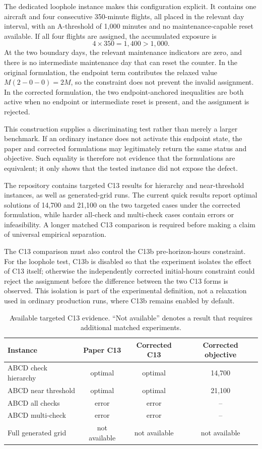 The dedicated loophole instance makes this configuration explicit. It contains
one aircraft and four consecutive 350-minute flights, all placed in the
relevant day interval, with an A-threshold of 1,000 minutes and no
maintenance-capable reset available. If all four flights are assigned, the
accumulated exposure is
\begin{equation}
  4\times 350 = 1,400 > 1,000.
\end{equation}
At the two boundary days, the relevant maintenance indicators are zero, and
there is no intermediate maintenance day that can reset the counter. In the
original formulation, the endpoint term contributes the relaxed value
$M(2-0-0)=2M$, so the constraint does not prevent the invalid assignment. In
the corrected formulation, the two endpoint-anchored inequalities are both
active when no endpoint or intermediate reset is present, and the assignment
is rejected.

This construction supplies a discriminating test rather than merely a larger
benchmark. If an ordinary instance does not activate this endpoint state, the
paper and corrected formulations may legitimately return the same status and
objective. Such equality is therefore not evidence that the formulations are
equivalent; it only shows that the tested instance did not expose the defect.

The repository contains targeted C13 results for hierarchy and near-threshold
instances, as well as generated-grid runs. The current quick results report
optimal solutions of 14,700 and 21,100 on the two targeted cases under the
corrected formulation, while harder all-check and multi-check cases contain
errors or infeasibility. A longer matched C13 comparison is required before
making a claim of universal empirical separation.

The C13 comparison must also control the C13b pre-horizon-hours constraint.
For the loophole test, C13b is disabled so that the experiment isolates the
effect of C13 itself; otherwise the independently corrected initial-hours
constraint could reject the assignment before the difference between the two
C13 forms is observed. This isolation is part of the experimental definition,
not a relaxation used in ordinary production runs, where C13b remains enabled
by default.

\begin{table}[t]
\centering\small
\caption{Available targeted C13 evidence. ``Not available'' denotes a result
that requires additional matched experiments.}
\label{tab:c13_anchor}
\begin{tabular}{lccc}
\toprule
Instance & Paper C13 & Corrected C13 & Corrected objective \\
\midrule
ABCD check hierarchy & optimal & optimal & 14,700 \\
ABCD near threshold & optimal & optimal & 21,100 \\
ABCD all checks & error & error & -- \\
ABCD multi-check & error & error & -- \\
Full generated grid & not available & not available & not available \\
\bottomrule
\end{tabular}
\end{table}

